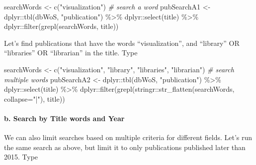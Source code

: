 \documentclass[
]{article}
\newenvironment{Shaded}{\begin{snugshade}}{\end{snugshade}}
\newcommand{\AttributeTok}[1]{\textcolor[rgb]{0.77,0.63,0.00}{#1}}
\newcommand{\CommentTok}[1]{\textcolor[rgb]{0.56,0.35,0.01}{\textit{#1}}}
\newcommand{\FunctionTok}[1]{\textcolor[rgb]{0.00,0.00,0.00}{#1}}
\newcommand{\NormalTok}[1]{#1}
\newcommand{\OtherTok}[1]{\textcolor[rgb]{0.56,0.35,0.01}{#1}}
\newcommand{\SpecialCharTok}[1]{\textcolor[rgb]{0.00,0.00,0.00}{#1}}
\newcommand{\StringTok}[1]{\textcolor[rgb]{0.31,0.60,0.02}{#1}}
\begin{document}
\begin{Shaded}
\begin{Highlighting}[]
\NormalTok{searchWords }\OtherTok{\textless{}{-}} \FunctionTok{c}\NormalTok{(}\StringTok{"visualization"}\NormalTok{) }\CommentTok{\# search a word}
\NormalTok{pubSearchA1 }\OtherTok{\textless{}{-}}\NormalTok{ dplyr}\SpecialCharTok{::}\FunctionTok{tbl}\NormalTok{(dbWoS, }\StringTok{"publication"}\NormalTok{) }\SpecialCharTok{\%\textgreater{}\%}
\NormalTok{  dplyr}\SpecialCharTok{::}\FunctionTok{select}\NormalTok{(title) }\SpecialCharTok{\%\textgreater{}\%}
\NormalTok{  dplyr}\SpecialCharTok{::}\FunctionTok{filter}\NormalTok{(}\FunctionTok{grepl}\NormalTok{(searchWords, title))}
\end{Highlighting}
\end{Shaded}

Let's find publications that have the words ``visualization'', and
``library'' OR ``libraries'' OR ``librarian'' in the title. Type

\begin{Shaded}
\begin{Highlighting}[]
\NormalTok{searchWords }\OtherTok{\textless{}{-}} \FunctionTok{c}\NormalTok{(}\StringTok{"visualization"}\NormalTok{, }\StringTok{"library"}\NormalTok{, }\StringTok{"libraries"}\NormalTok{, }\StringTok{"librarian"}\NormalTok{) }\CommentTok{\# search multiple words}
\NormalTok{pubSearchA2 }\OtherTok{\textless{}{-}}\NormalTok{ dplyr}\SpecialCharTok{::}\FunctionTok{tbl}\NormalTok{(dbWoS, }\StringTok{"publication"}\NormalTok{) }\SpecialCharTok{\%\textgreater{}\%}
\NormalTok{  dplyr}\SpecialCharTok{::}\FunctionTok{select}\NormalTok{(title) }\SpecialCharTok{\%\textgreater{}\%}
\NormalTok{  dplyr}\SpecialCharTok{::}\FunctionTok{filter}\NormalTok{(}\FunctionTok{grepl}\NormalTok{(stringr}\SpecialCharTok{::}\FunctionTok{str\_flatten}\NormalTok{(searchWords, }\AttributeTok{collapse=}\StringTok{"|"}\NormalTok{), title))}
\end{Highlighting}
\end{Shaded}

\hypertarget{b.-search-by-title-words-and-year}{%
\paragraph{b. Search by Title words and
Year}\label{b.-search-by-title-words-and-year}}

We can also limit searches based on multiple criteria for different
fields. Let's run the same search as above, but limit it to only
publications published later than 2015. Type
\end{document}
